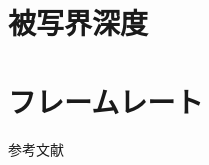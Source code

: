 \documentclass[8pt, jfont=ipaexm, t]{beamer} %
\begin{document}
\section{被写界深度}

\section{フレームレート}



\begin{frame}[allowframebreaks]{参考文献}
  \beamertemplatetextbibitems
	
  \nocite{*}
	
\end{frame}
\end{document}
